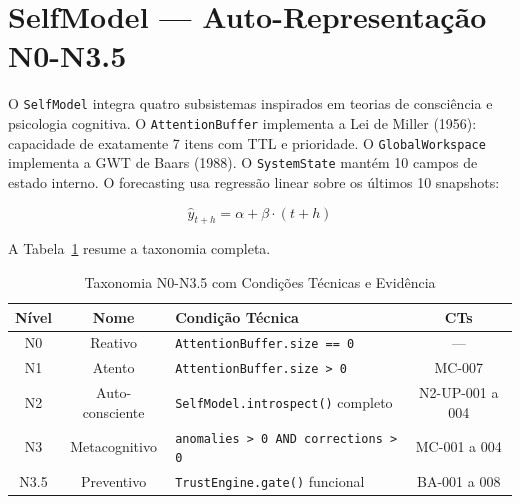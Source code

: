 \section{SelfModel — Auto-Representação N0-N3.5}

O \texttt{SelfModel} integra quatro subsistemas inspirados em teorias de consciência e psicologia cognitiva. O \texttt{AttentionBuffer} implementa a Lei de Miller (1956): capacidade de exatamente 7 itens com TTL e prioridade. O \texttt{GlobalWorkspace} implementa a GWT de Baars (1988). O \texttt{SystemState} mantém 10 campos de estado interno. O forecasting usa regressão linear sobre os últimos 10 snapshots:

\begin{equation}
\hat{y}_{t+h} = \alpha + \beta \cdot (t + h)
\label{eq:forecast}
\end{equation}

A Tabela~\ref{tab:niveis} resume a taxonomia completa.

\begin{table}[H]
\centering
\small
\caption{Taxonomia N0-N3.5 com Condições Técnicas e Evidência}
\label{tab:niveis}
\begin{tabular}{cclc}
\toprule
\textbf{Nível} & \textbf{Nome} & \textbf{Condição Técnica} & \textbf{CTs} \\
\midrule
N0 & Reativo & \texttt{AttentionBuffer.size == 0} & — \\
N1 & Atento & \texttt{AttentionBuffer.size > 0} & MC-007 \\
N2 & Auto-consciente & \texttt{SelfModel.introspect()} completo & N2-UP-001 a 004 \\
N3 & Metacognitivo & \texttt{anomalies > 0 AND corrections > 0} & MC-001 a 004 \\
N3.5 & Preventivo & \texttt{TrustEngine.gate()} funcional & BA-001 a 008 \\
\bottomrule
\end{tabular}
\end{table}
